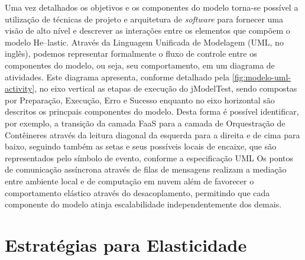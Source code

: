 \documentclass[english,brazilian]{UNISINOSmonografia} %
\begin{document}
Uma vez detalhados os objetivos e os componentes do modelo torna-se possível a utilização de técnicas de projeto e arquitetura de \textit{software} para fornecer uma visão de alto nível e descrever as interações entre os elementos que compõem o modelo \textsf{He}--lastic.
Através da Linguagem Unificada de Modelagem (UML, no inglês), podemos representar formalmente o fluxo de controle entre os componentes do modelo, ou seja, seu comportamento, em um diagrama de atividades.
%
Este diagrama apresenta, conforme detalhado pela \autoref{fig:modelo-uml-activity}, no eixo vertical as etapas de execução do jModelTest, sendo compostas por { Preparação,  Execução, Erro e Sucesso} enquanto no eixo horizontal são descritos os princpais componentes do modelo.
%
Desta forma é possível identificar, por exemplo, a transição da camada FaaS para a camada de Orquestração de Contêineres através da leitura diagonal da esquerda para a direita e de cima para baixo, seguindo também as setas e seus possíveis locais de encaixe, que são representados pelo símbolo de evento, conforme a especificação UML
%
Os pontos de comunicação assíncrona através de filas de mensagens realizam a mediação entre ambiente local e de computação em nuvem além de favorecer o comportamento elástico através do desacoplamento, permitindo que cada componente do modelo atinja escalabilidade independentemente dos demais.





\section{Estratégias para Elasticidade}
\label{sec:estrategias-elasticidade}
\end{document}
